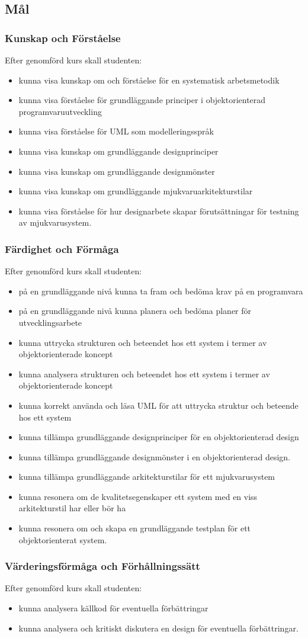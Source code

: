 \documentclass[10pt]{article}
\newenvironment{goal}[1]
{\subsubsection*{#1}
Efter genomförd kurs skall studenten:
\begin{itemize}
}
{\end{itemize}}
\begin{document}
\begin{multicols}{2}
\section{Mål}
\begin{goal}{Kunskap och Förståelse}
\item kunna visa kunskap om och förståelse för en systematisk arbetsmetodik
\item kunna visa förståelse för grundläggande principer i objektorienterad programvaruutveckling
\item kunna visa förståelse för UML som modelleringsspråk
\item kunna visa kunskap om grundläggande designprinciper
\item kunna visa kunskap om grundläggande designmönster
\item kunna visa kunskap om grundläggande mjukvaruarkitekturstilar
\item kunna visa förståelse för hur designarbete skapar förutsättningar för testning av mjukvarusystem.
\end{goal}

\begin{goal}{Färdighet och Förmåga}
\item på en grundläggande nivå kunna ta fram och bedöma krav på en programvara
\item på en grundläggande nivå kunna planera och bedöma planer för utvecklingsarbete
\item kunna uttrycka strukturen och beteendet hos ett system i termer av objektorienterade koncept
\item kunna analysera strukturen och beteendet hos ett system i termer av objektorienterade koncept
\item kunna korrekt använda och läsa UML för att uttrycka struktur och beteende hos ett system
\item kunna tillämpa grundläggande designprinciper för en objektorienterad design
\item kunna tillämpa grundläggande designmönster i en objektorienterad design.
\item kunna tillämpa grundläggande arkitekturstilar för ett mjukvarusystem
\item kunna resonera om de kvalitetsegenskaper ett system med en viss arkitekturstil har eller bör ha
\item kunna resonera om och skapa en grundläggande testplan för ett objektorienterat system.
\end{goal}

\begin{goal}{Värderingsförmåga och Förhållningssätt}
\item kunna analysera källkod för eventuella förbättringar
\item kunna analysera och kritiskt diskutera en design för eventuella förbättringar.
\end{goal}


\end{multicols}
\end{document}
